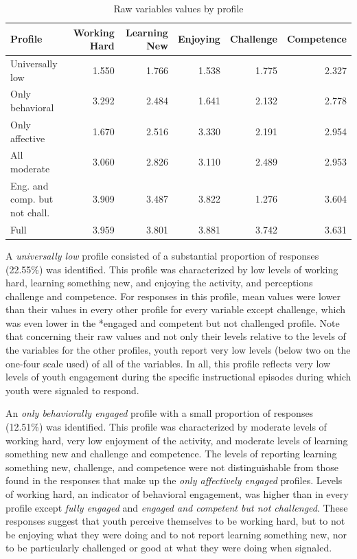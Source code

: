 \documentclass[]{book}
\theoremstyle{definition}
\theoremstyle{definition}
\theoremstyle{definition}
\theoremstyle{remark}
\begin{document}
\begin{landscape}\begin{table}

\caption{\label{tab:unnamed-chunk-13}Raw variables values by profile}
\centering
\begin{tabular}[t]{lrrrrr}
\toprule
Profile & Working Hard & Learning New & Enjoying & Challenge & Competence\\
\midrule
Universally low & 1.550 & 1.766 & 1.538 & 1.775 & 2.327\\
Only behavioral & 3.292 & 2.484 & 1.641 & 2.132 & 2.778\\
Only affective & 1.670 & 2.516 & 3.330 & 2.191 & 2.954\\
All moderate & 3.060 & 2.826 & 3.110 & 2.489 & 2.953\\
Eng. and comp. but not chall. & 3.909 & 3.487 & 3.822 & 1.276 & 3.604\\
Full & 3.959 & 3.801 & 3.881 & 3.742 & 3.631\\
\bottomrule
\end{tabular}
\end{table}
\end{landscape}

A \emph{universally low} profile consisted of a substantial proportion
of responses (22.55\%) was identified. This profile was characterized by
low levels of working hard, learning something new, and enjoying the
activity, and perceptions challenge and competence. For responses in
this profile, mean values were lower than their values in every other
profile for every variable except challenge, which was even lower in the
*engaged and competent but not challenged profile. Note that concerning
their raw values and not only their levels relative to the levels of the
variables for the other profiles, youth report very low levels (below
two on the one-four scale used) of all of the variables. In all, this
profile reflects very low levels of youth engagement during the specific
instructional episodes during which youth were signaled to respond.

An \emph{only behaviorally engaged} profile with a small proportion of
responses (12.51\%) was identified. This profile was characterized by
moderate levels of working hard, very low enjoyment of the activity, and
moderate levels of learning something new and challenge and competence.
The levels of reporting learning something new, challenge, and
competence were not distinguishable from those found in the responses
that make up the \emph{only affectively engaged} profiles. Levels of
working hard, an indicator of behavioral engagement, was higher than in
every profile except \emph{fully engaged} and \emph{engaged and
competent but not challenged}. These responses suggest that youth
perceive themselves to be working hard, but to not be enjoying what they
were doing and to not report learning something new, nor to be
particularly challenged or good at what they were doing when signaled.
\end{document}
